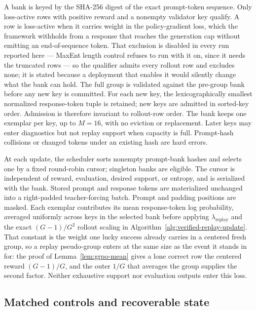 \documentclass{article}
\newcommand{\1}{\mathbf 1}
\theoremstyle{remark}
\theoremstyle{definition}
\theoremstyle{plain}
\begin{document}
A bank is keyed by the SHA-256 digest of the exact prompt-token sequence.
Only loss-active rows with positive reward and a nonempty validator key
qualify. A row is loss-active when it carries weight in the policy-gradient
loss, which the framework withholds from a response that reaches the
generation cap without emitting an end-of-sequence token. That exclusion is
disabled in every run reported here --- MaxEnt length control refuses to run
with it on, since it needs the truncated rows --- so the qualifier admits
every rollout row and excludes none; it is stated because a deployment that
enables it would silently change what the bank can hold. The full group is validated against the pre-group bank before
any new key is committed. For each new key, the lexicographically smallest
normalized response-token tuple is retained; new keys are admitted in
sorted-key order. Admission is therefore invariant to rollout-row order.
The bank keeps one exemplar per key, up to $M=16$, with no eviction or
replacement. Later keys may enter diagnostics but not replay support when
capacity is full. Prompt-hash collisions or changed tokens under an
existing hash are hard errors.

At each update, the scheduler sorts nonempty prompt-bank hashes and selects
one by a fixed round-robin cursor; singleton banks are eligible. The cursor
is independent of reward, evaluation, desired support, or entropy, and is
serialized with the bank. Stored prompt and response tokens are
materialized unchanged into a right-padded teacher-forcing batch. Prompt
and padding positions are masked. Each exemplar contributes its mean
response-token log probability, averaged uniformly across keys in the
selected bank before applying $\lambda_{\mathrm{replay}}$ and the exact
$(G-1)/G^2$ rollout scaling in
Algorithm~\ref{alg:verified-replay-update}. That constant is the weight one
lucky success already carries in a centered fresh group, so a replay
pseudo-group enters at the same size as the event it stands in for: the proof
of Lemma~\ref{lem:grpo-mean} gives a lone correct row the centered reward
$(G-1)/G$, and the outer $1/G$ that averages the group supplies the second
factor. Neither exhaustive support nor
evaluation outputs enter this loss.

\subsection{Matched controls and recoverable state}
\label{app:algorithm-control}
\end{document}
